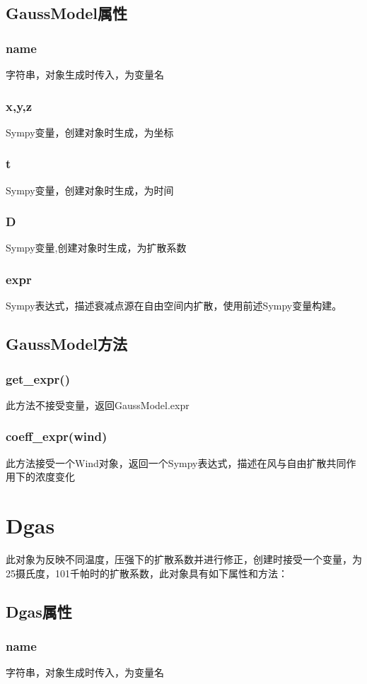 \documentclass[]{ctexart}
\begin{document}
\subsection{GaussModel属性}
\subsubsection{name}
字符串，对象生成时传入，为变量名
\subsubsection{x,y,z}
Sympy变量，创建对象时生成，为坐标
\subsubsection{t}
Sympy变量，创建对象时生成，为时间
\subsubsection{D}
Sympy变量,创建对象时生成，为扩散系数
\subsubsection{expr}
Sympy表达式，描述衰减点源在自由空间内扩散，使用前述Sympy变量构建。
\subsection{GaussModel方法}
\subsubsection{get\_expr()}
此方法不接受变量，返回GaussModel.expr
\subsubsection{coeff\_expr(wind)}
此方法接受一个Wind对象，返回一个Sympy表达式，描述在风与自由扩散共同作用下的浓度变化
\section{Dgas}
此对象为反映不同温度，压强下的扩散系数并进行修正，创建时接受一个变量，为25摄氏度，101千帕时的扩散系数，此对象具有如下属性和方法：
\subsection{Dgas属性}
\subsubsection{name}
字符串，对象生成时传入，为变量名
\end{document}
